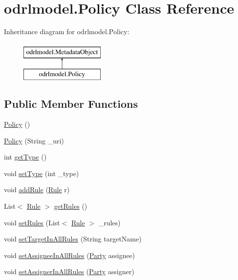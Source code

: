 \hypertarget{classodrlmodel_1_1_policy}{\section{odrlmodel.\-Policy Class Reference}
\label{classodrlmodel_1_1_policy}
}
Inheritance diagram for odrlmodel.\-Policy\-:\begin{figure}[H]
\begin{center}
\leavevmode
\includegraphics[height=2.000000cm]{classodrlmodel_1_1_policy}
\end{center}
\end{figure}
\subsection*{Public Member Functions}
\begin{DoxyCompactItemize}
\item 
\hyperlink{classodrlmodel_1_1_policy_aa9b13e9353f711831ebedfd0aae45872}{Policy} ()
\item 
\hyperlink{classodrlmodel_1_1_policy_aebe74ea9719b1d43c650964f1ec6b7fb}{Policy} (String \-\_\-uri)
\item 
int \hyperlink{classodrlmodel_1_1_policy_a288746977d9b84e16ba7db3e1dda4068}{get\-Type} ()
\item 
void \hyperlink{classodrlmodel_1_1_policy_a4c74f621b29d742f9df45a9bf0c95826}{set\-Type} (int \-\_\-type)
\item 
void \hyperlink{classodrlmodel_1_1_policy_a8100fcce6e529bcb638698274209a7ab}{add\-Rule} (\hyperlink{classodrlmodel_1_1_rule}{Rule} r)
\item 
List$<$ \hyperlink{classodrlmodel_1_1_rule}{Rule} $>$ \hyperlink{classodrlmodel_1_1_policy_a112aa1e5e6afcbd40ddc4db602a19edf}{get\-Rules} ()
\item 
void \hyperlink{classodrlmodel_1_1_policy_a04cf98a54bb431b372a1603115c6b590}{set\-Rules} (List$<$ \hyperlink{classodrlmodel_1_1_rule}{Rule} $>$ \-\_\-rules)
\item 
void \hyperlink{classodrlmodel_1_1_policy_ab7f7e6cb828a4ab801b1641742d90446}{set\-Target\-In\-All\-Rules} (String target\-Name)
\item 
void \hyperlink{classodrlmodel_1_1_policy_a2cbd861f16cd8c942f5905d2b64dc836}{set\-Assignee\-In\-All\-Rules} (\hyperlink{classodrlmodel_1_1_party}{Party} assignee)
\item 
void \hyperlink{classodrlmodel_1_1_policy_a5db6c01f28698efbc325763bd93ad265}{set\-Assigner\-In\-All\-Rules} (\hyperlink{classodrlmodel_1_1_party}{Party} assigner)
\end{DoxyCompactItemize}
